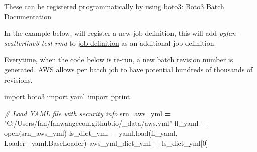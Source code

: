 \documentclass[
]{book}
\newenvironment{Shaded}{\begin{snugshade}}{\end{snugshade}}
\newcommand{\BuiltInTok}[1]{#1}
\newcommand{\CommentTok}[1]{\textcolor[rgb]{0.56,0.35,0.01}{\textit{#1}}}
\newcommand{\DecValTok}[1]{\textcolor[rgb]{0.00,0.00,0.81}{#1}}
\newcommand{\ImportTok}[1]{#1}
\newcommand{\NormalTok}[1]{#1}
\newcommand{\OperatorTok}[1]{\textcolor[rgb]{0.81,0.36,0.00}{\textbf{#1}}}
\newcommand{\StringTok}[1]{\textcolor[rgb]{0.31,0.60,0.02}{#1}}
\begin{document}
These can be registered programmatically by using boto3: \href{https://boto3.amazonaws.com/v1/documentation/api/latest/reference/services/batch.html}{Boto3 Batch Documentation}

In the example below, will register a new job definition, this will add \emph{pyfan-scatterline3-test-rmd} to \href{https://console.aws.amazon.com/batch/v2/home?region=us-east-1\#job-definition}{job definition} as an additional job definition.

Everytime, when the code below is re-run, a new batch revision number is generated. AWS allows per batch job to have potential hundreds of thousands of revisions.

\begin{Shaded}
\begin{Highlighting}[]
\ImportTok{import}\NormalTok{ boto3}
\ImportTok{import}\NormalTok{ yaml}
\ImportTok{import}\NormalTok{ pprint}

\CommentTok{\# Load YAML file with security info}
\NormalTok{srn\_aws\_yml }\OperatorTok{=} \StringTok{"C:/Users/fan/fanwangecon.github.io/\_data/aws.yml"}
\NormalTok{fl\_yaml }\OperatorTok{=} \BuiltInTok{open}\NormalTok{(srn\_aws\_yml)}
\NormalTok{ls\_dict\_yml }\OperatorTok{=}\NormalTok{ yaml.load(fl\_yaml, Loader}\OperatorTok{=}\NormalTok{yaml.BaseLoader)}
\NormalTok{aws\_yml\_dict\_yml }\OperatorTok{=}\NormalTok{ ls\_dict\_yml[}\DecValTok{0}\NormalTok{]}


\end{Highlighting}
\end{Shaded}
\end{document}
